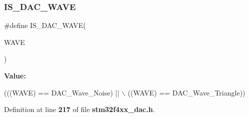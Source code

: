 \mbox{\label{group__DAC__wave__generation_ga45c25065fb713820f6dbae0009376e1c}} 
\subsubsection{I\+S\+\_\+\+D\+A\+C\+\_\+\+W\+A\+VE}
{\footnotesize\ttfamily \#define I\+S\+\_\+\+D\+A\+C\+\_\+\+W\+A\+VE(\begin{DoxyParamCaption}\item[{}]{W\+A\+VE }\end{DoxyParamCaption})}

{\bfseries Value\+:}
\begin{DoxyCode}
(((WAVE) == DAC_Wave_Noise) || \(\backslash\)
                           ((WAVE) == DAC_Wave_Triangle))
\end{DoxyCode}


Definition at line \textbf{ 217} of file \textbf{ stm32f4xx\+\_\+dac.\+h}.

